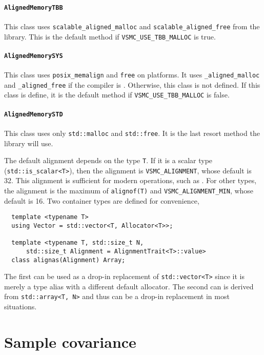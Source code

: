 \paragraph{\texttt{AlignedMemoryTBB}} This class uses
\verb|scalable_aligned_malloc| and \verb|scalable_aligned_free| from the \tbb
library. This is the default method if \verb|VSMC_USE_TBB_MALLOC| is true.

\paragraph{\texttt{AlignedMemorySYS}} This class uses \verb|posix_memalign| and
\verb|free| on \posix platforms. It uses \verb|_aligned_malloc| and
\verb|_aligned_free| if the compiler is \msvc. Otherwise, this class is not
defined. If this class is define, it is the default method if
\verb|VSMC_USE_TBB_MALLOC| is false.

\paragraph{\texttt{AlignedMemorySTD}} This class uses only \verb|std::malloc|
and \verb|std::free|. It is the last resort method the library will use.

The default alignment depends on the type \verb|T|. If it is a scalar type
(\verb|std::is_scalar<T>|), then the alignment is \verb|VSMC_ALIGNMENT|, whose
default is 32. This alignment is sufficient for modern \simd operations, such
as \avx. For other types, the alignment is the maximum of \verb|alignof(T)| and
\verb|VSMC_ALIGNMENT_MIN|, whose default is 16. Two container types are defined
for convenience,
\begin{Verbatim}
  template <typename T>
  using Vector = std::vector<T, Allocator<T>>;

  template <typename T, std::size_t N,
      std::size_t Alignment = AlignmentTrait<T>::value>
  class alignas(Alignment) Array;
\end{Verbatim}
The first can be used as a drop-in replacement of \verb|std::vector<T>| since
it is merely a type alias with a different default allocator. The second can is
derived from \verb|std::array<T, N>| and thus can be a drop-in replacement in
most situations.

\section{Sample covariance}
\label{sec:Sample covariance}

